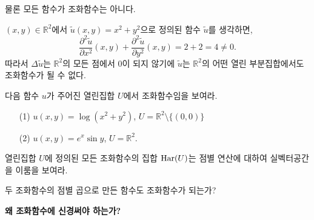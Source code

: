 물론 모든 함수가 조화함수는 아니다.

\begin{saltexample}[label=example-5-2]{}{}
$(x,y)\in \mathbb R^2$에서 $\tilde u(x,y) = x^2+y^2$으로 정의된 함수  $\tilde u$를 생각하면,
\[
\dfrac{\partial^2 \tilde u}{\partial x^2} (x,y) 
+ \dfrac{\partial^2 \tilde u}{\partial y^2} (x,y) = 2+2=4\ne 0.
\]
따라서 $\Delta \tilde u$는 $\mathbb R^2$의 모든 점에서 $0$이 되지 않기에
$\tilde u$는 $\mathbb R^2$의 어떤 열린 부분집합에서도 조화함수가 될 수 없다.
\end{saltexample}

\begin{salt_exercise}\label{ex-5-1}
다음 함수 $u$가 주어진 열린집합 $U$에서 조화함수임을 보여라.
\begin{itemize}
\item[(1)] $u(x,y) = \log (x^2+y^2)$, $U = \mathbb R^2\setminus \{(0,0)\}$
\item[(2)] $u(x,y) = e^x\sin y$, $U=\mathbb R^2$.
\end{itemize}
\end{salt_exercise}

\begin{salt_exercise}\label{ex-5-2}
열린집합 $U$에 정의된 모든 조화함수의 집합 $\mathop{\mathrm{Har}}(U)$는
점별 연산에 대하여 실벡터공간을 이룸을 보여라.
\end{salt_exercise}

\begin{salt_exercise}\label{ex-5-3}
두 조화함수의 점별 곱으로 만든 함수도 조화함수가 되는가?
\end{salt_exercise}

{\bf 왜 조화함수에 신경써야 하는가?}

